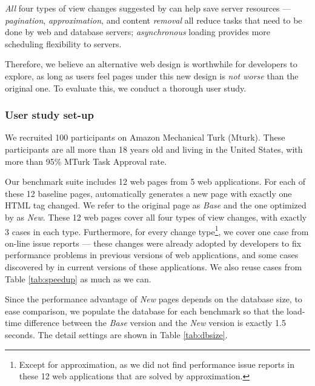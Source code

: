 {\it All} four types of view changes suggested by \Tool can help save server
resources --- {\it pagination}, {\it approximation}, and content {\it removal} all reduce
tasks that need to be done by web and database servers; {\it asynchronous}
loading provides more scheduling flexibility to servers.

Therefore, we believe an alternative
web design is worthwhile for developers to explore, as long as users feel 
pages under this new design is {\it not worse} than the original one.
To evaluate this, we conduct a thorough user study.


\subsubsection{User study set-up}
We recruited 100 participants on Amazon Mechanical Turk (Mturk). 
These participants are all more than 18 years old and
living in the United States, with more than 95\% MTurk Task Approval rate. 

Our benchmark suite includes 12 web pages from 5 web applications. 
For each of these 12 baseline pages, \Tool automatically generates a new page
with exactly one HTML tag changed. We refer to the original page as {\it Base} and the
one optimized by \Tool as {\it New}. These 12 web pages 
cover all four types of view changes, with exactly 3 cases in each type. 
Furthermore,
for every change type\footnote{Except for approximation, as we did not find 
performance issue reports in these 12 web applications that are solved by approximation.}, 
we cover one case from on-line issue reports ---
these changes were already adopted by developers to fix performance problems in previous versions of 
web applications, and some cases discovered by \Tool in current versions of these applications.
We also reuse cases from Table \ref{tab:speedup} as
much as we can.

Since the performance advantage of {\it New} pages depends on the database size, to ease
 comparison, we populate 
the database for each benchmark so that the
load-time difference between the {\it Base} version and the {\it New} version is exactly 1.5 seconds. The detail settings are shown in 
Table \ref{tab:dbsize}.


